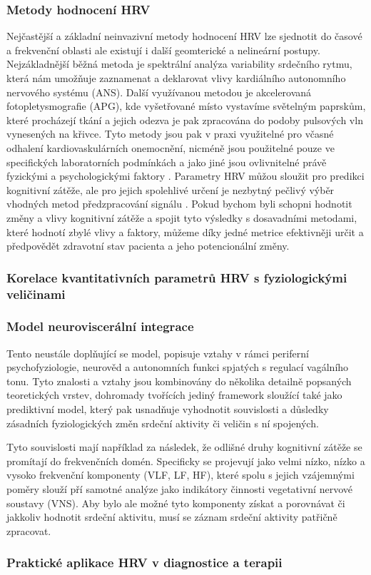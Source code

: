 \subsubsection{Metody hodnocení HRV}
Nejčastější a základní neinvazivní metody hodnocení HRV lze sjednotit do časové
a frekvenční oblasti ale existují i další geomterické a nelineární postupy.
Nejzákladnější běžná metoda je spektrální analýza variability srdečního rytmu,
která nám umožňuje zaznamenat a deklarovat vlivy kardiálního autonomního
nervového systému (ANS). Další využívanou metodou je akcelerovaná
fotopletysmografie (APG), kde vyšetřované místo vystavíme světelným paprskům,
které procházejí tkání a jejich odezva je pak zpracována do podoby pulsových vln
vynesených na křivce. Tyto metody jsou pak v praxi využitelné pro včasné
odhalení kardiovaskulárních onemocnění, nicméně jsou použitelné pouze ve
specifických laboratorních podmínkách a jako jiné jsou ovlivnitelné právě
fyzickými a psychologickými faktory \cite{[2, 4, 5]}. Parametry HRV můžou
sloužit pro predikci kognitivní zátěže, ale pro jejich spolehlivé určení je
nezbytný pečlivý výběr vhodných metod předzpracování signálu \cite{[1, 3]}.
Pokud bychom byli schopni hodnotit změny a vlivy kognitivní zátěže a spojit tyto
výsledky s dosavadními metodami, které hodnotí zbylé vlivy a faktory, můžeme
díky jedné metrice efektivněji určit a předpovědět zdravotní stav pacienta a
jeho potencionální změny.

\subsubsection{Korelace kvantitativních parametrů HRV s fyziologickými veličinami}


\subsubsection{Model neuroviscerální integrace}
Tento neustále doplňující se model, popisuje vztahy v rámci periferní
psychofyziologie, neurověd a autonomních funkci spjatých s regulací vagálního
tonu. Tyto znalosti a vztahy jsou kombinovány do několika detailně popsaných
teoretických vrstev, dohromady tvořících jediný framework sloužící také jako
prediktivní model, který pak usnadňuje vyhodnotit souvislosti a důsledky
zásadních fyziologických změn srdeční aktivity či veličin s ní spojených.

Tyto souvislosti mají například za následek, že odlišné druhy kognitivní zátěže
se promítají do frekvenčních domén. Specificky se projevují jako velmi nízko,
nízko a vysoko frekvenční komponenty (VLF, LF, HF), které spolu s jejich
vzájemnými poměry slouží pří samotné analýze jako indikátory činnosti
vegetativní nervové soustavy (VNS). Aby bylo ale možné tyto komponenty získat a
porovnávat či jakkoliv hodnotit srdeční aktivitu, musí se záznam srdeční
aktivity patřičně zpracovat.

\subsubsection{Praktické aplikace HRV v diagnostice a terapii}
